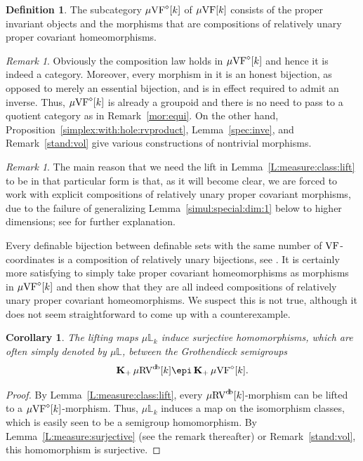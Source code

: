 \documentclass[12pt]{amsart}
\theoremstyle{plain}
\newtheorem{cor}[thm]{Corollary}
\theoremstyle{definition}
\newtheorem{defn}[thm]{Definition}
\theoremstyle{remark}
\newtheorem{rem}[thm]{Remark}
\numberwithin{equation}{section}
\theoremstyle{plain}
\newcommand{\VF}{\textup{VF}}
\newcommand{\RV}{\textup{RV}}
\newcommand{\0}{\emptyset}
\newcommand{\bb}[1]{\mathbb{#1}}
\newcommand{\mVF}{{\mu}{\VF}}
\newcommand{\mgVF}{{\mu} {\VF}}
\newcommand{\mRV}{{\mu}{\RV}}
\DeclareMathOperator{\gsk}{\mathbf{K}_+}
\DeclareMathOperator{\db}{d \! b}
\begin{document}
\begin{defn}\label{defn:diamond}
The subcategory $\mVF^{\diamond}[k]$ of $\mVF[k]$ consists of the proper invariant objects and the morphisms that are compositions of relatively unary proper covariant homeomorphisms.
\end{defn}

\begin{rem}\label{dia:cat:well}
Obviously the composition law holds in  $\mgVF^{\diamond}[k]$ and hence it is indeed a category. Moreover, every morphism in it is an honest  bijection, as opposed to merely an essential bijection, and is in effect required to admit an inverse.  Thus, $\mgVF^{\diamond}[k]$ is already a groupoid and there is no need to pass to a quotient category as in Remark~\ref{mor:equi}. On the other hand, Proposition~\ref{simplex:with:hole:rvproduct}, Lemma~\ref{spec:inve}, and Remark~\ref{stand:vol} give various constructions of nontrivial morphisms.
\end{rem}

\begin{rem}
The main reason that we need the lift in Lemma~\ref{L:measure:class:lift} to be in that particular form is that, as it will become clear, we are forced to work with explicit compositions of relatively unary proper covariant morphisms, due to the failure of generalizing Lemma~\ref{simul:special:dim:1} below to higher dimensions; see \cite[\S~1]{Yin:int:acvf} for further explanation.

Every definable bijection between definable sets with the same number of $\VF$-coordinates is a composition of relatively unary bijections, see \cite[Lemma~5.6]{Yin:int:acvf}.   It is certainly more satisfying to simply take proper covariant homeomorphisms as morphisms in $\mVF^{\diamond}[k]$ and then show that they are all indeed compositions of relatively unary proper covariant homeomorphisms. We suspect this is not true, although it does not seem straightforward to come up with a counterexample.
\end{rem}




\begin{cor}\label{L:sur:c}
The lifting maps ${\mu}\bb L_{k}$ induce surjective homomorphisms, which are often simply denoted by ${\mu}\bb L$, between the Grothendieck semigroups
\[
 \gsk \mRV^{\db}[k] \epi \gsk \mVF^{\diamond}[k].
\]
\end{cor}
\begin{proof}
By Lemma~\ref{L:measure:class:lift}, every $\mRV^{\db}[k]$-morphism can be lifted to a $\mVF^{\diamond}[k]$-morphism. Thus, ${\mu}\bb L_{k}$ induces a map on the isomorphism classes, which is easily seen to be a semigroup homomorphism. By Lemma~\ref{L:measure:surjective} (see the remark thereafter) or Remark~\ref{stand:vol}, this  homomorphism is surjective.
\end{proof}
\end{document}
